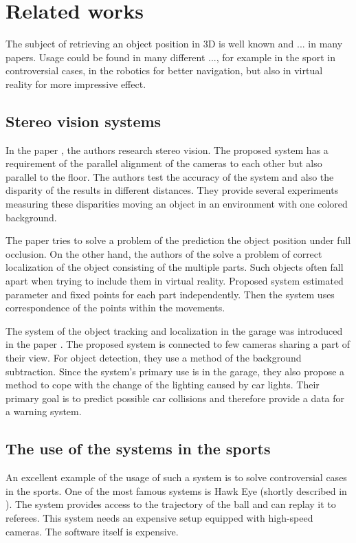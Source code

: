 \chapter{Related works} The subject of retrieving an object position in 3D is
well known and ... in many papers. Usage could be found in many different ...,
for example in the sport in controversial cases, in the robotics for better
navigation, but also in virtual reality for more impressive effect.

\section{Stereo vision systems}

In the paper \citet*{zheng2010study}, the authors research stereo vision. The
proposed system has a requirement of the parallel alignment of the cameras to
each other but also parallel to the floor. The authors test the accuracy of the
system and also the disparity of the results in different distances. They
provide several experiments measuring these disparities moving an object in an
environment with one colored background.

The paper \citet*{black2002multi} tries to solve a problem of the prediction
the object position under full occlusion. On the other hand, the authors of the
\citet*{yonemoto1998tracking} solve a problem of correct localization of the
object consisting of the multiple parts. Such objects often fall apart when
trying to include them in virtual reality. Proposed system estimated parameter
and fixed points for each part independently. Then the system uses
correspondence of the points within the movements.

The system of the object tracking and localization in the garage was introduced
in the paper \citet*{ibisch2915arbitrary}. The proposed system is connected to
few cameras sharing a part of their view. For object detection, they use a
method of the background subtraction. Since the system's primary use is in the
garage, they also propose a method to cope with the change of the lighting
caused by car lights. Their primary goal is to predict possible car collisions
and therefore provide a data for a warning system.

\section{The use of the systems in the sports}

An excellent example of the usage of such a system is to solve controversial
cases in the sports. One of the most famous systems is Hawk Eye (shortly
described in \citet*{owens2003hawk}). The system provides access to the
trajectory of the ball and can replay it to referees. This system needs an
expensive setup equipped with high-speed cameras. The software itself is
expensive.

